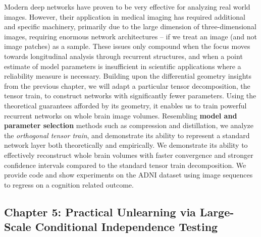 Modern deep networks have proven to be very effective for analyzing real world images.
However, their application in medical imaging has required additional and specific machinery,
primarily due to the large dimension of three-dimensional images,
requiring enormous network architectures --
if we treat an image (and not image patches) as a sample. 
These issues only compound when the focus moves towards longitudinal analysis
through recurrent structures, and when a point estimate of model parameters is insufficient 
in scientific applications where a reliability measure is necessary.
Building upon the differential geometry insights from the previous chapter, 
we will adapt 
a particular tensor decomposition, the tensor train, to construct networks
with significantly fewer parameters.
Using the theoretical guarantees afforded by its 
geometry,
it enables us to train powerful recurrent networks on whole brain image volumes. 
Resembling \textbf{model and parameter selection} methods
such as compression and distillation,
we analyze 
the \textit{orthogonal tensor train},
and demonstrate its ability to represent a standard network layer both theoretically and empirically.
We 
demonstrate its ability to 
effectively reconstruct whole brain volumes
with faster convergence and stronger confidence intervals
compared to the standard tensor train decomposition. 
We provide code and show experiments on the ADNI dataset
using image sequences to regress on a cognition related outcome.

\subsection{Chapter 5: Practical Unlearning via Large-Scale Conditional Independence Testing}

